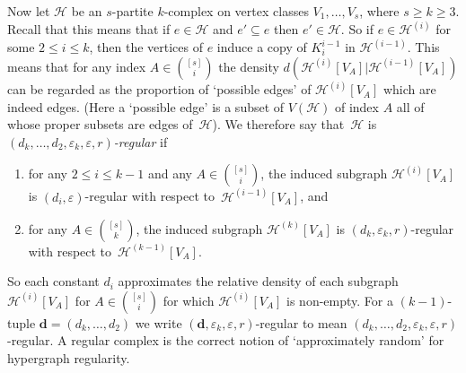 \documentclass[12pt,a4paper]{amsart}
\def\itm#1{\rm ({#1})}
\def\itmit#1{\itm{\it #1\,}}
\def\abc{\itmit{\alph{*}}}
\let\eps\varepsilon
\newcommand{\Hy}{\mathcal{H}}
\begin{document}
Now let $\Hy$ be an $s$-partite $k$-complex on
vertex classes $V_1, \dots, V_s$, where $s \geq k \geq 3$. Recall that this
means that if $e \in \Hy$ and $e' \subseteq e$ then $e' \in \Hy$. So if $e \in
\Hy^{(i)}$ for some $2 \leq i \leq k$, then the vertices of $e$ induce a copy of
$K^{i-1}_i$ in $\Hy^{(i-1)}$. This means that for any index $A \in \binom{[s]}{i}$ the
density $d(\Hy^{(i)}[V_A]|\Hy^{(i-1)}[V_A])$ can be regarded as the proportion of
`possible edges' of $\Hy^{(i)}[V_A]$ which are indeed edges. (Here a `possible edge' is a
subset of $V(\Hy)$ of index $A$ all of whose proper subsets are edges of~$\Hy$).
We therefore say that~$\Hy$ is \emph{$(d_k,\dots,d_2,\eps_k,\eps,r)$-regular} if
\begin{enumerate}[label=\abc]
 \item for any $2 \leq i \leq k-1$ and any $A \in
  \binom{[s]}{i}$, the induced subgraph $\Hy^{(i)}[V_A]$ is
  $(d_i,\eps)$-regular with respect to~$\Hy^{(i-1)}[V_A]$, and
 \item for any $A \in \binom{[s]}{k}$, the induced subgraph 
  $\Hy^{(k)}[V_A]$ is $(d_k, \eps_k, r)$-regular with respect to~$\Hy^{(k-1)}[V_A]$.
\end{enumerate}
So each constant $d_i$ approximates the relative density of each subgraph $\Hy^{(i)}[V_A]$ for $A \in \binom{[s]}{i}$ for which $\Hy^{(i)}[V_A]$ is non-empty.
For a $(k-1)$-tuple $\mathbf{d} = (d_k, \dots, d_2)$ we write
$(\mathbf{d},\eps_k,\eps,r)$-regular to mean
$(d_k,\dots,d_2,\eps_k,\eps,r)$-regular. 
A regular complex is the
correct notion of `approximately random' for hypergraph regularity.
\end{document}
